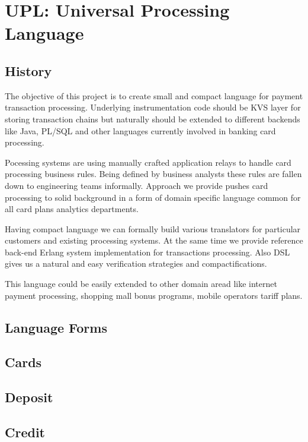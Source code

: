 \section{UPL: Universal Processing Language}

\subsection{History}

The objective of this project is to create small and compact
language for payment transaction processing. Underlying instrumentation
code should be KVS layer for storing transaction chains but
naturally should be extended to different backends like Java,
PL/SQL and other languages currently involved in banking card processing.

Pocessing systems are using manually crafted application
relays to handle card processing business rules. Being defined by business
analysts these rules are fallen down to engineering teams informally.
Approach we provide pushes card processing to solid background in a form
of domain specific language common for all card plans analytics departments.

Having compact language we can formally build various translators
for particular customers and existing processing systems. At the same time
we provide reference back-end Erlang system implementation
for transactions processing. Also DSL gives us a natural and easy
verification strategies and compactifications.

This language could be easily extended to other domain aread like
internet payment processing, shopping mall bonus programs, mobile
operators tariff plans.

\subsection{Language Forms}

\subsection{Cards}

\subsection{Deposit}

\subsection{Credit}

